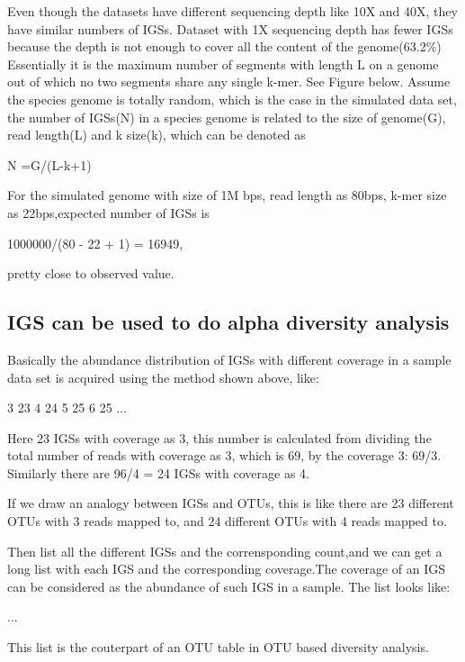 Even though the datasets have different sequencing depth like 10X and 40X, they have similar numbers of IGSs. Dataset with 1X sequencing depth has fewer IGSs because the depth is not enough to cover all the content of the genome(63.2\%) Essentially it is the maximum number of segments with length L on a genome out of which no two segments share any single k-mer. See Figure below. Assume the species genome is totally random, which is the case in the simulated data set, the number of IGSs(N) in a species genome is related to the size of genome(G), read length(L) and k size(k), which can be denoted as

N =G/(L-k+1)

For the simulated genome with size of 1M bps, read length as 80bps, k-mer size as 22bps,expected number of IGSs is 

1000000/(80 - 22 + 1) = 16949, 

pretty close to observed value.



\subsection{IGS can be used to do alpha diversity analysis}

Basically the abundance distribution of IGSs with different coverage in a sample data set is acquired using the method shown above, like:

    3 23
    4 24
    5 25
    6 25
    ...

Here 23 IGSs with coverage as 3, this number is calculated from dividing the total number of reads with coverage as 3, which is 69, by the coverage 3: 69/3. Similarly there are 96/4 = 24 IGSs with coverage as 4.

If we draw an analogy between IGSs and OTUs, this is like there are 23 different OTUs with 3 reads mapped to, and 24 different OTUs with 4 reads mapped to. 

Then list all the different IGSs and the corrensponding count,and we can get a long list with each IGS and the corresponding coverage.The coverage of an IGS can be considered as the abundance of such IGS in a sample. The list looks like:

    ...
  
This list is the couterpart of an OTU table in OTU based diversity analysis.

